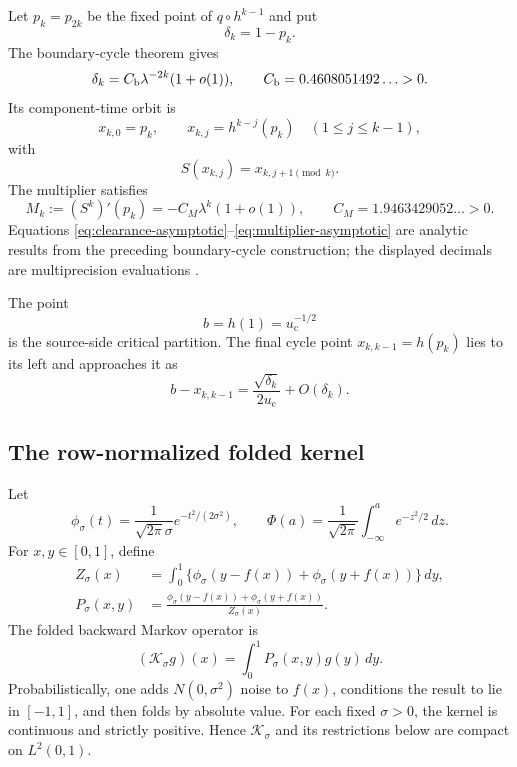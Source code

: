 \documentclass[11pt]{article}
\theoremstyle{definition}
\theoremstyle{remark}
\newcommand{\uc}{u_{\mathrm c}}
\newcommand{\cK}{\mathcal K}
\begin{document}
Let $p_k=p_{2k}$ be the fixed point of $q\circ h^{k-1}$ and put
\begin{equation}\label{eq:clearance}
 \delta_k=1-p_k.
\end{equation}
The boundary-cycle theorem gives
\begin{equation}\label{eq:clearance-asymptotic}
 \delta_k=C_{\rm b}\lambda^{-2k}(1+o(1)),
 \qquad
 C_{\rm b}=0.4608051492\ldots>0.
\end{equation}
Its component-time orbit is
\begin{equation}\label{eq:ordered-cycle}
 x_{k,0}=p_k,
 \qquad
 x_{k,j}=h^{k-j}(p_k)\quad(1\le j\le k-1),
\end{equation}
with
\begin{equation}\label{eq:cycle-order}
 S(x_{k,j})=x_{k,j+1\pmod k}.
\end{equation}
The multiplier satisfies
\begin{equation}\label{eq:multiplier-asymptotic}
 M_k:=(S^k)'(p_k)
 =-C_M\lambda^k(1+o(1)),
 \qquad C_M=1.9463429052\ldots>0.
\end{equation}
Equations \eqref{eq:clearance-asymptotic}--\eqref{eq:multiplier-asymptotic}
are analytic results from the preceding boundary-cycle construction; the
displayed decimals are multiprecision evaluations
\citep{WangTimeOrdered2026}.

The point
\begin{equation}\label{eq:partition-b}
 b=h(1)=\uc^{-1/2}
\end{equation}
is the source-side critical partition.  The final cycle point
$x_{k,k-1}=h(p_k)$ lies to its left and approaches it as
\begin{equation}\label{eq:last-point-scale}
 b-x_{k,k-1}
 =\frac{\sqrt{\delta_k}}{2\uc}+O(\delta_k).
\end{equation}

\subsection{The row-normalized folded kernel}

Let
\begin{equation}\label{eq:normal-density}
 \phi_\sigma(t)=\frac1{\sqrt{2\pi}\sigma}
 e^{-t^2/(2\sigma^2)},
 \qquad
 \Phi(a)=\frac1{\sqrt{2\pi}}\int_{-\infty}^a e^{-z^2/2}\,dz.
\end{equation}
For $x,y\in[0,1]$, define
\begin{align}
 Z_\sigma(x)
 &=\int_0^1\{\phi_\sigma(y-f(x))+\phi_\sigma(y+f(x))\}\,dy,
 \label{eq:normalization}\\
 P_\sigma(x,y)
 &=\frac{\phi_\sigma(y-f(x))+\phi_\sigma(y+f(x))}
 {Z_\sigma(x)}.
 \label{eq:folded-kernel}
\end{align}
The folded backward Markov operator is
\begin{equation}\label{eq:markov-operator}
 (\cK_\sigma g)(x)=\int_0^1P_\sigma(x,y)g(y)\,dy.
\end{equation}
Probabilistically, one adds $N(0,\sigma^2)$ noise to $f(x)$, conditions the
result to lie in $[-1,1]$, and then folds by absolute value.  For each fixed
$\sigma>0$, the kernel is continuous and strictly positive.  Hence
$\cK_\sigma$ and its restrictions below are compact on $L^2(0,1)$.
\end{document}
